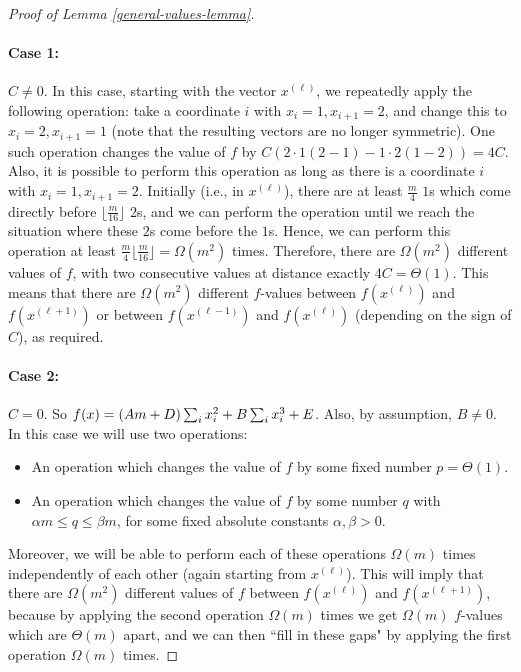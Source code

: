 \documentclass[10pt,a4paper]{amsart}
\begin{document}
\begin{proof}[Proof of Lemma \ref{general-values-lemma}]
    \paragraph{Case 1:} $C \neq 0$.  
    In this case, starting with the vector $x^{(\ell)}$, we repeatedly apply the following operation: take a coordinate $i$ with $x_i = 1, x_{i+1} = 2$, and change this to $x_i = 2, x_{i+1} = 1$ (note that the resulting vectors are no longer symmetric). 
    One such operation changes the value of $f$ by 
    $C(2 \cdot 1(2-1) - 1 \cdot 2(1-2)) = 4C$. 
    Also, it is possible to perform this operation as long as there is a coordinate $i$ with $x_i = 1, x_{i+1} = 2$. Initially (i.e., in $x^{(\ell)}$), there are at least $\frac{m}{4}$ $1$s which come directly before $\lfloor \frac{m}{16} \rfloor$ $2$s, and we can perform the operation until we reach the situation where these $2$s come before the $1$s. Hence, we can perform this operation at least 
    $\frac{m}{4} \lfloor \frac{m}{16} \rfloor = \Omega(m^2)$ times. Therefore, there are $\Omega(m^2)$ different values of $f$, with two consecutive values at distance exactly $4C = \Theta(1)$. This means that there are $\Omega(m^2)$ different $f$-values between $f(x^{(\ell)})$ and $f(x^{(\ell+1)})$ or between 
    $f(x^{(\ell-1)})$ and $f(x^{(\ell)})$ (depending on the sign of $C$), as required. 
    
    \paragraph{Case 2:} $C = 0$. 
    So $f(x) = (Am+ \nolinebreak D) \sum_{i} x_i^2 + 
	B \sum_{i} x_i^3 + E$.
    Also, by assumption, $B \neq 0$. 
    In this case we will use two operations:
    \begin{itemize}
        \item An operation which changes the value of $f$ by some fixed number $p = \Theta(1)$.
        \item An operation which changes the value of $f$ by some number $q$ with $\alpha m \leq q \leq \beta m$, for some fixed absolute constants $\alpha,\beta > 0$.
    \end{itemize}
    Moreover, we will be able to perform each of these operations $\Omega(m)$ times independently of each other (again starting from $x^{(\ell)}$). 
    This will imply that there are $\Omega(m^2)$ different values of $f$ between $f(x^{(\ell)})$ and $f(x^{(\ell+1)})$, 
    because by applying the second operation $\Omega(m)$ times we get $\Omega(m)$ $f$-values which are $\Theta(m)$ apart, and we can then ``fill in these gaps" by applying the first operation $\Omega(m)$ times.
    

\end{proof}
\end{document}
